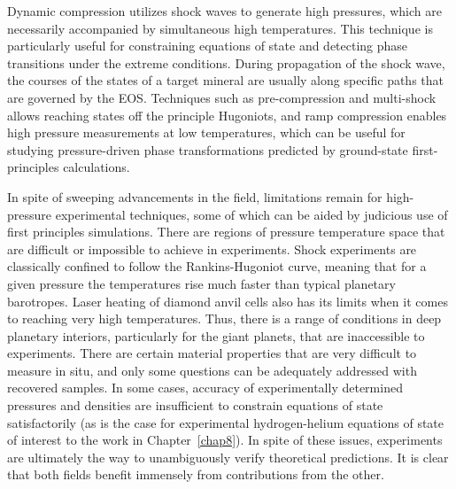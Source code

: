 Dynamic compression utilizes shock waves to generate high pressures, which are
necessarily accompanied by simultaneous high temperatures. This technique is
particularly useful for constraining equations of state and detecting phase
transitions under the extreme conditions. During propagation of the shock wave,
the courses of the states of a target mineral are usually along specific paths
that are governed by the EOS. Techniques such as pre-compression and
multi-shock allows reaching states off the principle Hugoniots, and ramp
compression enables high pressure measurements at low temperatures, which can
be useful for studying pressure-driven phase transformations predicted by
ground-state first-principles calculations.

In spite of sweeping advancements in the field, limitations remain for
high-pressure experimental techniques, some of which can be aided by judicious
use of first principles simulations. There are regions of pressure temperature
space that are difficult or impossible to achieve in experiments. Shock
experiments are classically confined to follow the Rankins-Hugoniot curve,
meaning that for a given pressure the temperatures rise much faster than
typical planetary barotropes. Laser heating of diamond anvil cells also has its
limits when it comes to reaching very high temperatures. Thus, there is a range
of conditions in deep planetary interiors, particularly for the giant planets,
that are inaccessible to experiments. There are certain material properties
that are very difficult to measure in situ, and only some questions can be
adequately addressed with recovered samples. In some cases, accuracy of
experimentally determined pressures and densities are insufficient to constrain
equations of state satisfactorily (as is the case for experimental
hydrogen-helium equations of state of interest to the work in
Chapter~\ref{chap8}). In spite of these issues, experiments are ultimately the
way to unambiguously verify theoretical predictions. It is clear that both
fields benefit immensely from contributions from the other.

